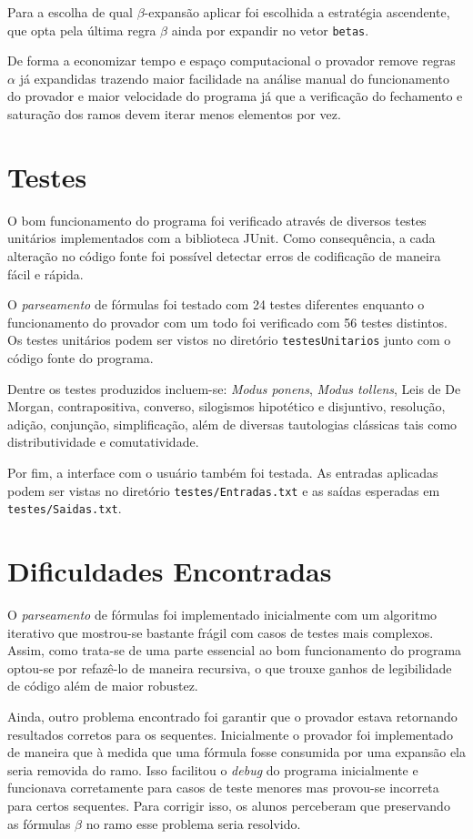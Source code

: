 \documentclass[brazil,times]{abnt}
\begin{document}
	Para a escolha de qual $\beta$-expansão aplicar foi escolhida a estratégia
	ascendente, que opta pela última regra $\beta$ ainda por expandir no vetor
	\texttt{betas}.
	
	De forma a economizar tempo e espaço computacional o provador remove regras
	$\alpha$ já expandidas trazendo maior facilidade na análise manual do
	funcionamento do provador e maior velocidade do programa já que a verificação
	do fechamento e saturação dos ramos devem iterar menos elementos por vez.


\section*{Testes}
	O bom funcionamento do programa foi verificado através de diversos testes
	unitários implementados com a biblioteca JUnit. Como consequência, a cada
	alteração no código fonte foi possível detectar erros de codificação de maneira
	fácil e rápida.
	
	O \textit{parseamento} de fórmulas foi testado com 24 testes diferentes
	enquanto o funcionamento do provador com um todo foi verificado com 56 testes
	distintos. Os testes unitários podem ser vistos no diretório
	\texttt{testesUnitarios} junto com o código fonte do programa.
	
	Dentre os testes produzidos incluem-se: \textit{Modus ponens}, \textit{Modus
	tollens}, Leis de De Morgan, contrapositiva, converso, silogismos hipotético e
	disjuntivo, resolução, adição, conjunção, simplificação, além de diversas
	tautologias clássicas tais como distributividade e comutatividade.
	
	Por fim, a interface com o usuário também foi testada. As entradas aplicadas
	podem ser vistas no diretório \texttt{testes/Entradas.txt} e as saídas esperadas em
	\texttt{testes/Saidas.txt}.

\section*{Dificuldades Encontradas}
	O \textit{parseamento} de fórmulas foi implementado inicialmente com um
	algoritmo iterativo que mostrou-se bastante frágil com casos de testes mais
	complexos. Assim, como trata-se de uma parte essencial ao bom funcionamento do
	programa optou-se por refazê-lo de maneira recursiva, o que trouxe ganhos de
	legibilidade de código além de maior robustez.
	
	Ainda, outro problema encontrado foi garantir que o provador estava retornando
	resultados corretos para os sequentes. Inicialmente o provador foi implementado
	de maneira que à medida que uma fórmula fosse consumida por uma expansão ela
	seria removida do ramo. Isso facilitou o \textit{debug} do programa
	inicialmente e funcionava corretamente para casos de teste menores mas
	provou-se incorreta para certos sequentes. Para corrigir isso, os alunos
	perceberam que preservando as fórmulas $\beta$ no ramo esse problema seria
	resolvido.
\end{document}
